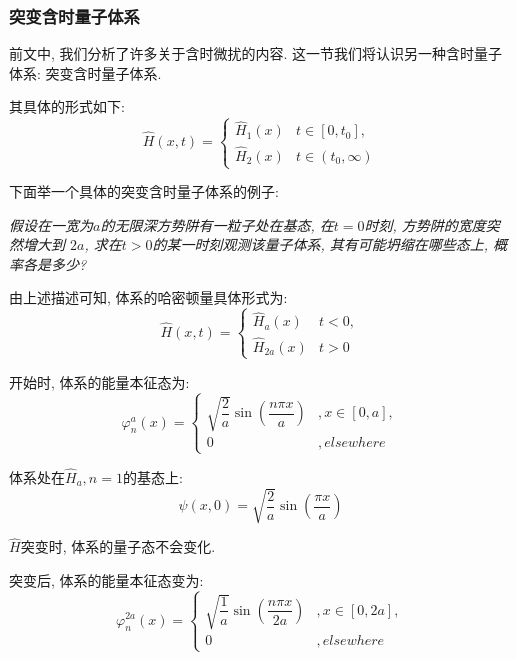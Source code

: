 \documentclass[a4paper, 11pt]{article}
\begin{document}
\begin{spacing}{1.2}
        \subsubsection{突变含时量子体系}
          前文中, 我们分析了许多关于含时微扰的内容. 这一节我们将认识另一种含时量子体系: 突变含时量子体系.

          其具体的形式如下:
          \begin{equation}
            \hat{H}(x, t) = 
            \begin{cases}
              \hat{H}_1(x) & t \in [0, t_0],\\
              \hat{H}_2(x) & t \in (t_0, \infty)
            \end{cases}
          \end{equation}

          下面举一个具体的突变含时量子体系的例子:
          \par
          \emph{假设在一宽为$a$的无限深方势阱有一粒子处在基态, 在$t=0$时刻, 方势阱的宽度突然增大到
          $2a$, 求在$t>0$的某一时刻观测该量子体系, 其有可能坍缩在哪些态上, 概率各是多少?}

          由上述描述可知, 体系的哈密顿量具体形式为:
          \begin{equation}
            \hat{H}(x, t) = 
            \begin{cases}
              \hat{H}_a(x) & t < 0,\\
              \hat{H}_{2a}(x) & t > 0
            \end{cases}
          \end{equation}

          开始时, 体系的能量本征态为:
          \begin{equation}
            \varphi^a_n(x) = 
            \begin{cases}
              \sqrt{\dfrac{2}{a}}\sin(\dfrac{n\pi{}x}{a}) & ,x\in[0, a],\\
              0 & ,elsewhere
            \end{cases}
          \end{equation}

          体系处在$\hat{H}_a, n=1$的基态上:
          \begin{equation}
            \psi(x, 0) = \sqrt{\frac{2}{a}}\sin(\frac{\pi{}x}{a})
          \end{equation}

          $\hat{H}$突变时, 体系的量子态不会变化.

          突变后, 体系的能量本征态变为:
          \begin{equation}
            \varphi^{2a}_n(x) = 
            \begin{cases}
              \sqrt{\dfrac{1}{a}}\sin(\dfrac{n\pi{}x}{2a}) & ,x\in[0, 2a],\\
              0 & ,elsewhere
            \end{cases}
          \end{equation}


\end{spacing}
\end{document}

